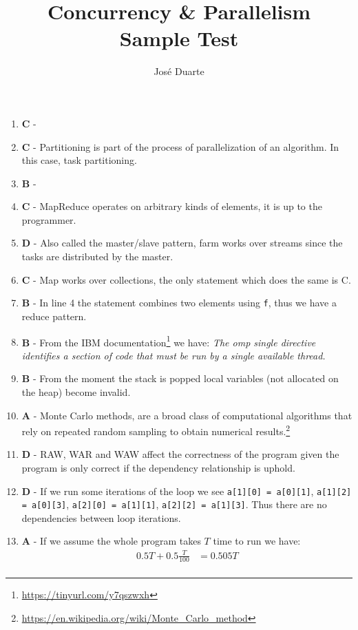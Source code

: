 \documentclass[a4paper,twocolumn]{article}
\title{Concurrency \& Parallelism\\Sample Test}
\author{José Duarte}
\begin{document}
\maketitle
\begin{enumerate}
    \item \textbf{C} -
    \item \textbf{C} - Partitioning is part of the process of parallelization of an algorithm. In this case, task partitioning.
    \item \textbf{B} -
    \item \textbf{C} - MapReduce operates on arbitrary kinds of elements, it is up to the programmer.
    \item \textbf{D} - Also called the master/slave pattern, farm works over streams since the tasks are distributed by the master.
    \item \textbf{C} - Map works over collections, the only statement which does the same is C.
    \item \textbf{B} - In line 4 the statement combines two elements using \texttt{f}, thus we have a reduce pattern.
    \item \textbf{B} - From the IBM documentation\footnote{\url{https://tinyurl.com/y7qszwxh}} we have:
    \textit{The omp single directive identifies a section of code that must be run by a single available thread.}
    \item \textbf{B} - From the moment the stack is popped local variables (not allocated on the heap) become invalid.
    \item \textbf{A} - Monte Carlo methods, are a broad class of computational algorithms that rely on repeated random sampling to obtain numerical results.\footnote{\url{https://en.wikipedia.org/wiki/Monte_Carlo_method}}
    \item \textbf{D} - RAW, WAR and WAW affect the correctness of the program given the program is only correct if the dependency relationship is uphold.
    \item \textbf{D} - If we run some iterations of the loop we see \texttt{a[1][0] = a[0][1]}, \texttt{a[1][2] = a[0][3]}, \texttt{a[2][0] = a[1][1]}, \texttt{a[2][2] = a[1][3]}.
    Thus there are no dependencies between loop iterations.
    \item \textbf{A} - If we assume the whole program takes $T$ time to run we have:
    \begin{equation*}
        \begin{split}
            0.5 T + 0.5\frac{T}{100} & = 0.505T \\

\end{split}
\end{equation*}
\end{enumerate}
\end{document}
